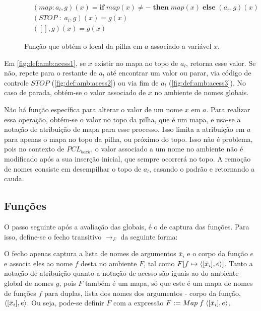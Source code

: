 \begin{figure}[ht]
	\begin{align}
		&(map : a_l, g)(x) = \mathbf{if}\; map(x) \neq - \;\mathbf{then}\; map(x) \;\mathbf{else}\; (a_r, g)(x)\label{fig:def:amb:acess1}\\
		&(STOP \;:\;a_l, g)(x) = g(x) \label{fig:def:amb:acess2}\\
		&([], g)(x) = g(x)\label{fig:def:amb:acess3}
	\end{align}
	\caption{Função que obtém o local da pilha em $a$ associado a variável $x$. }
	\label{fig:def:amb:acess}
\end{figure}

Em \ref{fig:def:amb:acess1}, se $x$ existir no mapa no topo de $a_l$, retorna esse valor. Se não, repete para o restante de $a_l$ até encontrar um valor ou parar, via código de controle $STOP$ (\ref{fig:def:amb:acess2}) ou via fim de $a_l$ (\ref{fig:def:amb:acess3}). No caso de parada, obtém-se o valor associado de $x$ no ambiente de nomes globais.

Não há função específica para alterar o valor de um nome $x$ em $a$. Para realizar essa operação, obtém-se o valor no topo da pilha, que é um mapa, e usa-se a notação de atribuição de mapa para esse processo. Isso limita a atribuição em $a$ para apenas o mapa no topo da pilha, ou próximo do topo. Isso não é problema, pois no contexto de $PCL_{back}$, o valor associado a um nome no ambiente não é modificado após a sua inserção inicial, que sempre ocorrerá no topo. A remoção de nomes consiste em desempilhar o topo de $a_l$, casando o padrão e retornando a cauda.

\subsection{Funções}

O passo seguinte após a avaliação das globais, é o de captura das funções. Para isso, define-se o fecho transitivo $\to_F$ da seguinte forma:

\noindent O fecho apenas captura a lista de nomes de argumentos $\bar x_i$ e o corpo da função $e$ e associa eles ao nome $f$ desta no ambiente $F$, tal como $F[f \mapsto \langle [\bar x_i], e \rangle]$. Tanto a notação de atribuição quanto a notação de acesso são iguais ao do ambiente global de nomes $g$, pois $F$ também é um mapa, só que este é um mapa de nomes de funções $f$ para duplas, lista dos nomes dos argumentos - corpo da função, $\langle [\bar x_i], e \rangle$. Ou seja, pode-se definir $F$ com a expressão $F := Map\;f\; \langle [\bar x_i], e \rangle$.

